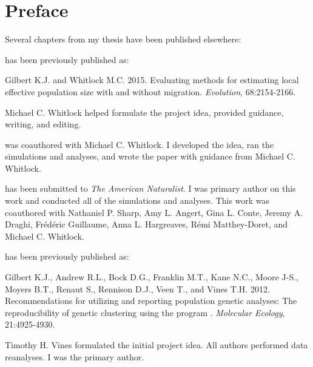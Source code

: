 \chapter*{Preface}

Several chapters from my thesis have been published elsewhere:

\textsc{} has been previously published as:
%
\begin{previouspaper}
  Gilbert K.J. and Whitlock M.C. 2015. Evaluating methods for estimating local effective 
  population size with and without migration. \emph{Evolution}, 68:2154-2166.
\end{previouspaper}
%
Michael C. Whitlock helped formulate the project idea, provided guidance, writing, and editing.

\textsc{} was coauthored with Michael C. Whitlock. I developed the idea, ran the simulations and analyses, and wrote the paper with guidance from Michael C. Whitlock.

\textsc{} has been submitted to \emph{The American Naturalist}. I was primary author on this work and conducted all of the simulations and analyses. This work was coauthored with Nathaniel P. Sharp, Amy L. Angert, Gina L. Conte, Jeremy A. Draghi, Fr\'ed\'eric Guillaume, Anna L. Hargreaves, R\'emi Matthey-Doret, and Michael C. Whitlock.

\textsc{} has been previously published as:
%
\begin{previouspaper}
  Gilbert K.J., Andrew R.L., Bock D.G., Franklin M.T., Kane N.C., Moore J-S., Moyers B.T., Renaut S., Rennison D.J., Veen T., and Vines T.H. 2012. Recommendations for utilizing and reporting population genetic analyses: The reproducibility of genetic clustering using the program . \emph{Molecular Ecology}, 21:4925-4930.
\end{previouspaper}
%
Timothy H. Vines formulated the initial project idea. All authors performed data reanalyses. I was the primary author.

